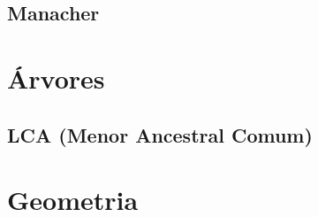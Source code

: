 % 

\subsection{Manacher}


% 

% 


\section{Árvores}

\subsection{LCA (Menor Ancestral Comum)}


% 

% 


\section{Geometria}

